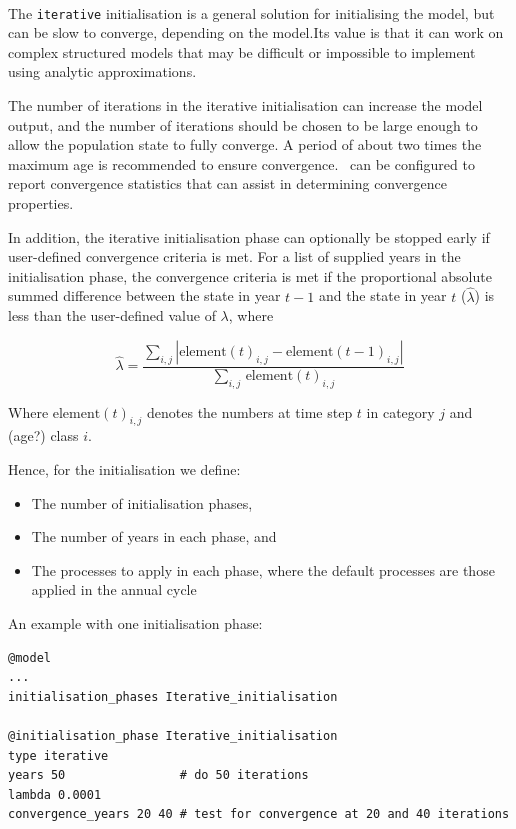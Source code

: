 \paragraph{}

The \texttt{iterative} initialisation is a general solution for initialising the model, but can be slow to converge, depending on the model.Its value is that it can work on complex structured models that may be difficult or impossible to implement using analytic approximations.

The number of iterations in the iterative initialisation can increase the model output, and the number of iterations should be chosen to be large enough to allow the population state to fully converge. A period of about two times the maximum age is recommended to ensure convergence. \CNAME~can be configured to report convergence statistics that can assist in determining convergence properties.

In addition, the iterative initialisation phase can optionally be stopped early if user-defined convergence criteria is met. For a list of supplied years in the initialisation phase, the convergence criteria is met if the proportional absolute summed difference between the state in year $t-1$ and the state in year $t$ ($\widehat{\lambda}$) is less than the user-defined value of $\lambda$, where

\begin{equation}
  \widehat{\lambda} = \frac{\sum\limits_{i,j}  \left|\text{element}(t)_{i,j} - \text{element}(t-1)_{i,j} \right|}{\sum\limits_{i,j} \frac{}{}\text{element}(t)_{i,j}}
\end{equation}

Where $\text{element}(t)_{i,j}$ denotes the numbers at time step $t$ in category $j$ and (age?) class $i$.

Hence, for the initialisation we define:

\begin{itemize}
  \item The number of initialisation phases,
  \item The number of years in each phase, and
  \item The processes to apply in each phase, where the default processes are those applied in the annual cycle
\end{itemize}

An example with one initialisation phase:

{\small{\begin{verbatim}
@model
...
initialisation_phases Iterative_initialisation

@initialisation_phase Iterative_initialisation
type iterative
years 50                # do 50 iterations
lambda 0.0001
convergence_years 20 40 # test for convergence at 20 and 40 iterations
\end{verbatim}}}

